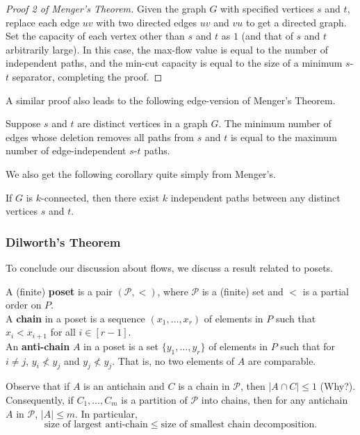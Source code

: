 			\begin{proof}[Proof 2 of Menger's Theorem]
				Given the graph $G$ with specified vertices $s$ and $t$, replace each edge $uv$ with two directed edges $uv$ and $vu$ to get a directed graph. Set the capacity of each vertex other than $s$ and $t$ as $1$ (and that of $s$ and $t$ arbitrarily large). In this case, the max-flow value is equal to the number of independent paths, and the min-cut capacity is equal to the size of a minimum $s$-$t$ separator, completing the proof. 
			\end{proof}

			A similar proof also leads to the following edge-version of Menger's Theorem.

			\begin{ftheo}
				Suppose $s$ and $t$ are distinct vertices in a graph $G$. The minimum number of edges whose deletion removes all paths from $s$ and $t$ is equal to the maximum number of edge-independent $s$-$t$ paths.
			\end{ftheo}

			We also get the following corollary quite simply from Menger's.

			\begin{fcor}
				If $G$ is $k$-connected, then there exist $k$ independent paths between any distinct vertices $s$ and $t$.
			\end{fcor}

		\subsubsection{Dilworth's Theorem}

			To conclude our discussion about flows, we discuss a result related to posets.

			\begin{fdef}[Poset]
				A (finite) \textbf{poset} is a pair $(\mathcal{P},<)$, where $\mathcal{P}$ is a (finite) set and $<$ is a partial order on $P$.\\
				A \textbf{chain} in a poset is a sequence $(x_1,\ldots,x_r)$ of elements in $P$ such that $x_i < x_{i+1}$ for all $i \in [r-1]$.\\
				An \textbf{anti-chain} $A$ in a poset is a set $\{y_1,\ldots,y_r\}$ of elements in $P$ such that for $i\ne j$, $y_i \not< y_j$ and $y_j \not< y_j$. That is, no two elements of $A$ are comparable.
			\end{fdef}

			Observe that if $A$ is an antichain and $C$ is a chain in $\mathcal{P}$, then $|A \cap C| \le 1$ (Why?).\\
			Consequently, if $C_1,\ldots,C_m$ is a partition of $\mathcal{P}$ into chains, then for any antichain $A$ in $\mathcal{P}$, $|A| \le m$. In particular,
			\[ \text{size of largest anti-chain} \le \text{size of smallest chain decomposition}. \]

